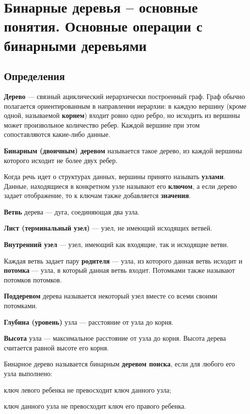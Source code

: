 \section{Бинарные деревья – основные понятия. Основные операции с бинарными деревьями}
\subsection{Определения}
\textbf{Дерево} --- связный ациклический иерархически построенный граф. Граф обычно
полагается ориентированным в направлении иерархии: в каждую вершину (кроме одной,
называемой \textbf{корнем}) входит ровно одно ребро, но исходить из вершины может
произвольное количество ребер. Каждой вершине при этом сопоставляются какие-либо данные.

\textbf{Бинарным (двоичным) деревом} называется такое дерево, из каждой вершины которого
исходит не более двух ребер.

Когда речь идет о структурах данных, вершины принято называть \textbf{узлами}.
Данные, находящиеся в конкретном узле называют его \textbf{ключом}, а если дерево задает
отображение, то к ключам также добавляется \textbf{значения}.

\textbf{Ветвь} дерева --- дуга, соединяющая два узла. 

\textbf{Лист (терминальный узел)} --- узел, не имеющий исходящих ветвей.

\textbf{Внутренний узел} --- узел, имеющий как входящие, так и исходящие ветви.

Каждая ветвь задает пару \textbf{родителя} --- узла, из которого данная ветвь исходит
и \textbf{потомка} --- узла, в который данная ветвь входит. Потомками также называют
потомков потомков.

\textbf{Поддеревом} дерева называется некоторый узел вместе со всеми своими потомками.

\textbf{Глубина (уровень)} узла --- расстояние от узла до корня.

\textbf{Высота} узла --- максимальное расстояние от узла до корня. Высота дерева считается
равной высоте его корня.

Бинарное дерево называется бинарным \textbf{деревом поиска}, если для любого его узла выполнено:
\begin{enuminl}
  \item ключ левого ребенка не превосходит ключ данного узла;
  \item ключ данного узла не превосходит ключ его правого ребенка.
\end{enuminl}

